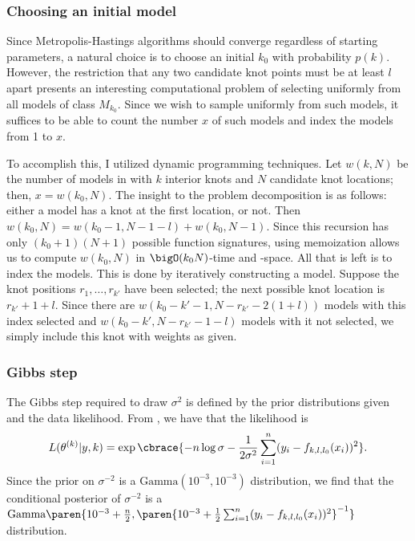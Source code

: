 \documentclass[12pt]{article}
\newcommand{\thetak}{\theta^{(k)}}
\begin{document}
\subsubsection{Choosing an initial model}

Since Metropolis-Hastings algorithms should converge regardless of
starting parameters, a natural choice is to choose an initial $k_0$
with probability $p(k)$. However, the restriction that any two
candidate knot points must be at least $l$ apart presents an
interesting computational problem of selecting uniformly from all
models of class $M_{k_0}$. Since we wish to sample uniformly from such
models, it suffices to be able to count the number $x$ of such models and
index the models from 1 to $x$.

To accomplish this, I utilized dynamic programming techniques. Let
$w(k, N)$ be the number of models in with $k$ interior knots and $N$
candidate knot locations; then, $x = w(k_0, N)$. The insight to the
problem decomposition is as follows: either a model has a knot at the
first location, or not. Then $w(k_0, N) = w(k_0 - 1, N - 1 - l) +
w(k_0, N - 1)$. Since this recursion has only $(k_0 + 1) (N + 1)$
possible function signatures, using memoization allows us to compute
$w(k_0, N)$ in $\bigO(k_0 N)$-time and -space. All that is left is to
index the models. This is done by iteratively constructing a
model. Suppose the knot positions $r_1, \ldots, r_{k'}$ have been
selected; the next possible knot location is $r_{k'} + 1 + l$. Since
there are $w(k_0 - k' - 1, N - r_{k'} - 2(1 + l))$ models with this index
selected and $w(k_0 - k', N - r_{k'} - 1 - l)$ models with it not
selected, we simply include this knot with weights as given.

\subsubsection{Gibbs step}

The Gibbs step required to draw $\sigma^2$ is defined by the prior
distributions given and the data likelihood. From
\cite{denison1998automatic}, we have that the likelihood is
\begin{equation*}
  L(\thetak | y, k) = \exp\cbrace{- n \log \sigma - \frac{1}{2
      \sigma^2} \sum_{i = 1}^n (y_i - f_{k, l, l_0}(x_i))^2}.
\end{equation*}
Since the prior on $\sigma^{-2}$ is a $\text{Gamma}(10^{-3}, 10^{-3})$
distribution, we find that the conditional posterior of $\sigma^{-2}$
is a $\text{Gamma}\paren{10^{-3} + \frac{n}{2}, \paren{10^{-3} +
    \frac{1}{2} \sum_{i = 1}^n (y_i - f_{k, l, l_0}(x_i))^2}^{-1}}$
distribution.
\end{document}
